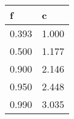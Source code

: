 \begin{tabular}{|l|l|}
    \hline
    f     & c      \\ \hline
    0.393 & 1.000  \\ \hline
    0.500 & 1.177  \\ \hline
    0.900 & 2.146 \\ \hline
    0.950 & 2.448 \\ \hline
    0.990 & 3.035  \\ \hline
\end{tabular}